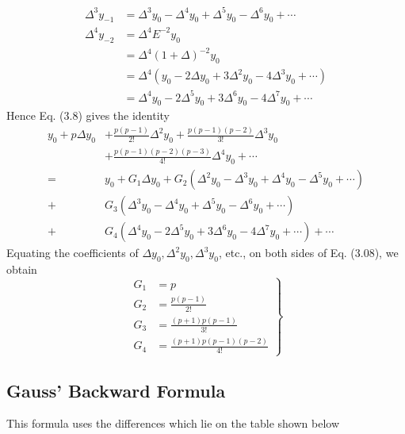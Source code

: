 \documentclass[12pt,a4paper,oneside]{book}
\begin{document}
$$
\begin{aligned}
	\Delta^3 y_{-1} & =\Delta^3 y_0-\Delta^4 y_0+\Delta^5 y_0-\Delta^6 y_0+\cdots \\
	\Delta^4 y_{-2} & =\Delta^4 E^{-2} y_0 \\
	& =\Delta^4(1+\Delta)^{-2} y_0 \\
	& =\Delta^4\left(y_0-2 \Delta y_0+3 \Delta^2 y_0-4 \Delta^3 y_0+\cdots\right) \\
	& =\Delta^4 y_0-2 \Delta^5 y_0+3 \Delta^6 y_0-4 \Delta^7 y_0+\cdots
\end{aligned}
$$
Hence Eq. (3.8) gives the identity
\begin{equation}\label{3.09}
	\begin{aligned}
		y_0+p \Delta y_0 & +\frac{p(p-1)}{2 !} \Delta^2 y_0+\frac{p(p-1)(p-2)}{3 !} \Delta^3 y_0 \\
		& +\frac{p(p-1)(p-2)(p-3)}{4 !} \Delta^4 y_0+\cdots \\
		= & y_0+G_1 \Delta y_0+G_2\left(\Delta^2 y_0-\Delta^3 y_0+\Delta^4 y_0-\Delta^5 y_0+\cdots\right) \\
		+ & G_3\left(\Delta^3 y_0-\Delta^4 y_0+\Delta^5 y_0-\Delta^6 y_0+\cdots\right) \\
		+ & G_4\left(\Delta^4 y_0-2 \Delta^5 y_0+3 \Delta^6 y_0-4 \Delta^7 y_0+\cdots\right)+\cdots
	\end{aligned}
\end{equation}
Equating the coefficients of $\Delta y_0, \Delta^2 y_0, \Delta^3 y_0$, etc., on both sides of Eq. (3.08), we obtain
\begin{equation}\label{3.10}
	\left.\begin{array}{rl}
		G_1 & =p \\
		G_2 & =\frac{p(p-1)}{2 !} \\
		G_3 & =\frac{(p+1) p(p-1)}{3 !} \\
		G_4 & =\frac{(p+1) p(p-1)(p-2)}{4 !}
	\end{array}\right\}
\end{equation}
\subsection{Gauss' Backward Formula}
This formula uses the  differences which lie on the table shown below \\
\end{document}
